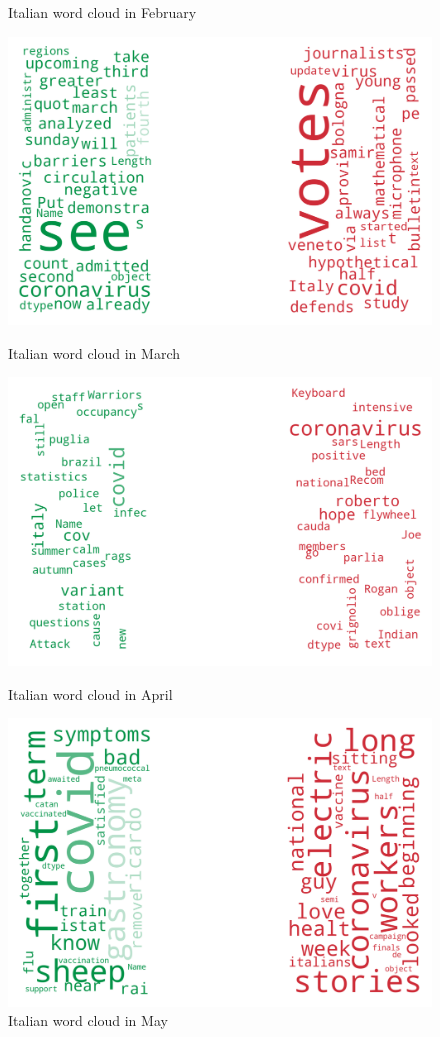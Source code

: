 \begin{landscape}
\begin{figure}[!htb]
  \caption{Italian word cloud in February}\label{fig:februaryit}
\endminipage
\end{figure}
\begin{figure}[!htb]
  \includegraphics[width=\linewidth]{March it word cloud.png}
  \caption{Italian word cloud in March}\label{fig:marchit}
\endminipage\hfill
{}
  \includegraphics[width=\linewidth]{April it word cloud.png}
  \caption{Italian word cloud in April}\label{fig:aprilit}
\endminipage\hfill
{}
  \includegraphics[width=\linewidth]{May it word cloud.png}
  \caption{Italian word cloud in May}\label{fig:mayit}
\endminipage
\end{figure}



\end{landscape}

